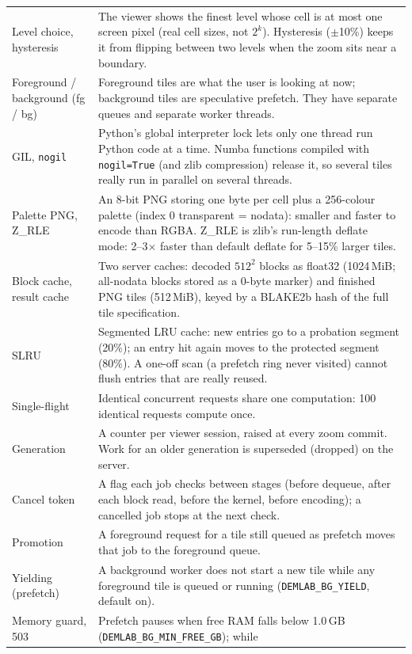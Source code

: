 ﻿\documentclass[11pt,a4paper]{article}
\newcommand{\code}[1]{\texttt{#1}}
\begin{document}
\begin{longtable}{>{\raggedright\arraybackslash}p{3.4cm}>{\raggedright\arraybackslash}p{12.0cm}}
Level choice, hysteresis & The viewer shows the finest level whose cell is at most one screen pixel (real cell sizes,
not $2^k$). Hysteresis ($\pm$10\%) keeps it from flipping between two levels when the zoom sits near a boundary. \\
Foreground / background (fg / bg) & Foreground tiles are what the user is looking at now; background tiles are
speculative prefetch. They have separate queues and separate worker threads. \\
GIL, \code{nogil} & Python's global interpreter lock lets only one thread run Python code at a time. Numba functions
compiled with \code{nogil=True} (and zlib compression) release it, so several tiles really run in parallel on
several threads. \\
Palette PNG, Z\_RLE & An 8-bit PNG storing one byte per cell plus a 256-colour palette (index 0 transparent =
nodata): smaller and faster to encode than RGBA. Z\_RLE is zlib's run-length deflate mode: 2--3$\times$ faster than
default deflate for 5--15\% larger tiles. \\
Block cache, result cache & Two server caches: decoded $512^2$ blocks as float32 (1024\,MiB; all-nodata blocks
stored as a 0-byte marker) and finished PNG tiles (512\,MiB), keyed by a BLAKE2b hash of the full tile
specification. \\
SLRU & Segmented LRU cache: new entries go to a probation segment (20\%); an entry hit again moves to the protected
segment (80\%). A one-off scan (a prefetch ring never visited) cannot flush entries that are really reused. \\
Single-flight & Identical concurrent requests share one computation: 100 identical requests compute once. \\
Generation & A counter per viewer session, raised at every zoom commit. Work for an older generation is superseded
(dropped) on the server. \\
Cancel token & A flag each job checks between stages (before dequeue, after each block read, before the kernel,
before encoding); a cancelled job stops at the next check. \\
Promotion & A foreground request for a tile still queued as prefetch moves that job to the foreground queue. \\
Yielding (prefetch) & A background worker does not start a new tile while any foreground tile is queued or running
(\code{DEMLAB\_BG\_YIELD}, default on). \\
Memory guard, 503 & Prefetch pauses when free RAM falls below 1.0\,GB (\code{DEMLAB\_BG\_MIN\_FREE\_GB}); while

\end{longtable}
\end{document}
